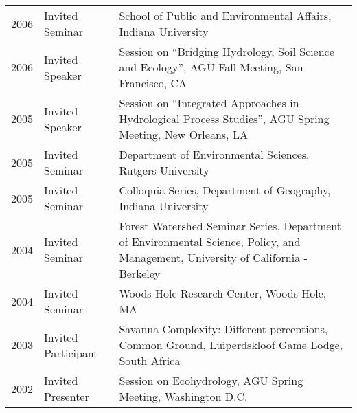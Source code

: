 \begin{longtable}{l p{3.0cm} p{11.5cm}}
2006 & Invited Seminar & School of Public and Environmental Affairs, Indiana University \\
2006 & Invited Speaker & Session on ``Bridging Hydrology, Soil Science and Ecology'', AGU Fall Meeting, San Francisco, CA \\
2005 & Invited Speaker & Session on ``Integrated Approaches in Hydrological Process Studies'', AGU Spring Meeting, New Orleans, LA \\
2005 & Invited Seminar & Department of Environmental Sciences, Rutgers University \\
2005 & Invited Seminar & Colloquia Series, Department of Geography, Indiana University \\
2004 & Invited Seminar & Forest Watershed Seminar Series, Department of Environmental Science, Policy, and Management, University of California - Berkeley \\
2004 & Invited Seminar & Woods Hole Research Center, Woods Hole, MA \\
2003 & Invited Participant & Savanna Complexity: Different perceptions, Common Ground, Luiperdskloof Game Lodge, South Africa \\
2002 & Invited Presenter & Session on Ecohydrology, AGU Spring Meeting, Washington D.C. \\
\end{longtable}
